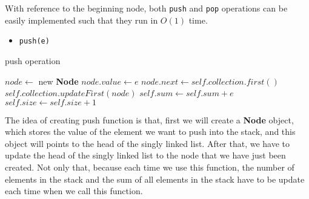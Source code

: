 \documentclass{article}
\begin{document}
	
	With reference to the beginning node, both \verb|push| and \verb|pop| operations can be easily implemented such that they run in \(O(1)\) time.

	\begin{itemize}
		\item \verb|push(e)|
	\end{itemize}
	
	\begin{algorithm}[H]
		\caption{push operation}
		\label{push}
	\begin{algorithmic}[1]
		\State \(node \gets \) new \textbf{Node} 
		\State \(node.value \gets e\) 
		\State \(node.next \gets self.collection.first()\) 
		\State \(self.collection.updateFirst(node)\) 
		\State \(self.sum \gets  self.sum + e\)
		\State \(self.size \gets  self.size + 1\)
		\EndFunction{}
	\end{algorithmic}		
	\end{algorithm}

	The idea of creating push function is that, first we will create a \textbf{Node} object, which stores the value of the element we want to push into the stack, and this object will points to the head of the singly linked list. After that, we have to update the head of the singly linked list to the node that we have just been created. Not only that, because each time we use this function, the number of elements in the stack and the sum of all elements in the stack have to be update each time when we call this function.
\end{document}
